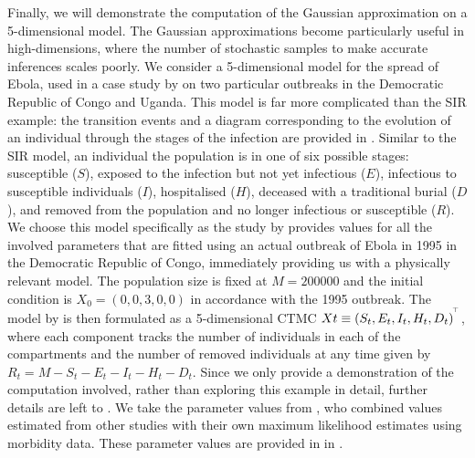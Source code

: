 Finally, we will demonstrate the computation of the Gaussian approximation on a 5-dimensional model.
The Gaussian approximations become particularly useful in high-dimensions, where the number of stochastic samples to make accurate inferences scales poorly.
We consider a 5-dimensional model for the spread of Ebola, used in a case study by \citet{LegrandEtAl_2007_UnderstandingDynamicsEbola} on two particular outbreaks in the Democratic Republic of Congo and Uganda.
This model is far more complicated than the SIR example: the transition events and a diagram corresponding to the evolution of an individual through the stages of the infection are provided in .
Similar to the SIR model, an individual the population is in one of six possible stages: susceptible (\(S\)), exposed to the infection but not yet infectious (\(E\)), infectious to susceptible individuals (\(I\)), hospitalised (\(H\)), deceased with a traditional burial (\(D\)), and removed from the population and no longer infectious or susceptible (\(R\)).
We choose this model specifically as the study by \citet{LegrandEtAl_2007_UnderstandingDynamicsEbola} provides values for all the involved parameters that are fitted using an actual outbreak of Ebola in 1995 in the Democratic Republic of Congo, immediately providing us with a physically relevant model. The population size is fixed at \(M = 200000\) \citep{DowellEtAl_1999_TransmissionEbolaHemorrhagic} and the initial condition is \(X_0 = (0, 0, 3, 0, 0)\) \citep{KhanEtAl_1999_ReemergenceEbolaHemorrhagic} in accordance with the 1995 outbreak.
The model by \citet{LegrandEtAl_2007_UnderstandingDynamicsEbola} is then formulated as a 5-dimensional CTMC \(Xt \equiv \left(S_t, E_t, I_t, H_t, D_t\right)^{^{\!\top}}\), where each component tracks the number of individuals in each of the compartments and the number of removed individuals at any time given by \(R_t = M - S_t - E_t - I_t - H_t - D_t\).
Since we only provide a demonstration of the computation involved, rather than exploring this example in detail, further details are left to .
We take the parameter values from \citet{LegrandEtAl_2007_UnderstandingDynamicsEbola}, who combined values estimated from other studies \citep{BwakaEtAl_1999_EbolaHemorrhagicFever,DowellEtAl_1999_TransmissionEbolaHemorrhagic,KhanEtAl_1999_ReemergenceEbolaHemorrhagic,NdambiEtAl_1999_EpidemiologicClinicalAspects,RoweEtAl_1999_ClinicalVirologicImmunologic} with their own maximum likelihood estimates using morbidity data.
These parameter values are provided in  in .

